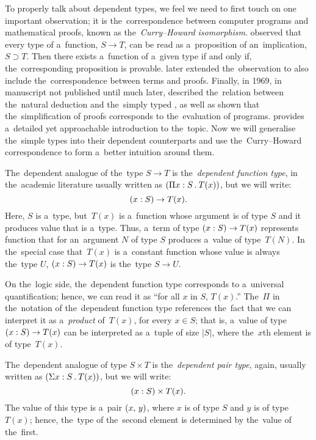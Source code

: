 To properly talk about dependent types, we feel we need to first touch on one
important observation; it is the~correspondence between computer programs and
mathematical proofs, known as the~\emph{Curry–Howard isomorphism}.
\citet{curry_1934} observed that every type of a~function, $S \to T$,
can be read as a~proposition of an~implication, $S \supset T$. Then there exists
a~function of a~given type if and only if, the~corresponding proposition is
provable. \citet{curry_1958} later extended the~observation to also include
the~correspondence between terms and proofs. Finally, in 1969, in manuscript not
published until much later, \citet{howard_1980} described the~relation between
the~natural deduction and the~simply typed \lc, as well as shown that
the~simplification of proofs corresponds to the~evaluation of programs.
\citet{wadler_2015} provides a~detailed yet approachable introduction to
the~topic. Now we will generalise the~simple types into their dependent
counterparts and use the~Curry–Howard correspondence to form a~better intuition
around them.

The~dependent analogue of the~type $S \to T$ is the~\emph{dependent
function type}, in the~academic literature usually written as ${(\Pi x \overset{}:
S \, . \: T(x))}$, but we will write:
\[
  (x : S) \to T(x).
\]
Here, $S$ is a~type, but \,$T(x)$ is a~function whose argument is of type $S$
and it produces value that is a~type. Thus, a~term of type $(x : S) \to T(x)$
represents function that for an~argument $N$ of type $S$ produces a~value of
type \,$T(N)$. In the~special case that \,$T(x)$ is a~constant function whose
value is always the~type $U$, $(x : S) \to T(x)$ is the~type $S \to U$.

On the~logic side, the~dependent function type corresponds to a~universal
quantification; hence, we can read it as ``for all $x$ in $S$, $T(x)$.''
The~$\Pi$ in the~notation of the~dependent function type references the~fact
that we can interpret it as a~\emph{product} of \,$T(x)$, for every $x \in S$;
that is, a~value of type $(x : S) \to T(x)$ can be interpreted as a~tuple of size
$|S|$, where the~$x$th element is of type \,$T(x)$.

The~dependent analogue of type $S \times T$ is the~\emph{dependent pair type},
again, usually written as ${(\Sigma x \overset{}: S \, . \: T(x))}$, but we will
write:
\[
  (x \overset{}: S) \times T(x).
\]
The value of this type is a~pair $(x, \, y)$, where $x$ is of type $S$ and $y$
is of type $T(x)$; hence, the~type of the~second element is determined by
the~value of the~first.

